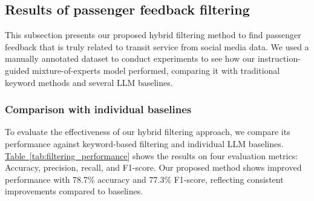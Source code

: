 \documentclass[a4paper,fleqn,12pt]{cas-sc}
\begin{document}



\subsection{Results of passenger feedback filtering}
This subsection presents our proposed hybrid filtering method to find passenger feedback that is truly related to transit service from social media data. We used a manually annotated dataset to conduct experiments to see how our instruction-guided mixture-of-experts model performed, comparing it with traditional keyword methods and several LLM baselines. 

\subsubsection{Comparison with individual baselines}

To evaluate the effectiveness of our hybrid filtering approach, we compare its performance against keyword-based filtering and individual LLM baselines. \hyperref[tab:filtering_performance]{Table~\ref{tab:filtering_performance}} shows the results on four evaluation metrics: Accuracy, precision, recall, and F1-score. Our proposed method shows improved performance with 78.7\% accuracy and 77.3\% F1-score, reflecting consistent improvements compared to baselines.
\end{document}
